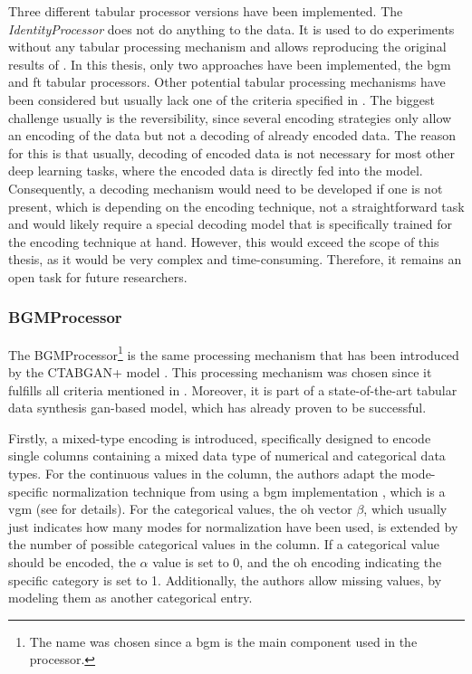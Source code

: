 Three different tabular processor versions have been implemented.
The \textit{IdentityProcessor} does not do anything to the data.
It is used to do experiments without any tabular processing mechanism and allows reproducing the original results of \cite{kotelnikov2022TabDDPMModellingTabular}.
In this thesis, only two approaches have been implemented, the \gls{bgm} and \gls{ft} tabular processors.
Other potential tabular processing mechanisms have been considered but usually lack one of the criteria specified in .
The biggest challenge usually is the reversibility, since several encoding strategies only allow an encoding of the data but not a decoding of already encoded data.
The reason for this is that usually, decoding of encoded data is not necessary for most other deep learning tasks, where the encoded data is directly fed into the model.
Consequently, a decoding mechanism would need to be developed if one is not present, which is depending on the encoding technique, not a straightforward task and would likely require a special decoding model that is specifically trained for the encoding technique at hand.
However, this would exceed the scope of this thesis, as it would be very complex and time-consuming.
Therefore, it remains an open task for future researchers.

\subsubsection{BGMProcessor}
\label{ch:BGMProcessor}

The BGMProcessor\footnote{The name was chosen since a \acrfull{bgm} is the main component used in the processor.} is the same processing mechanism that has been introduced by the CTABGAN+ model \cite{zhao2022CTABGANEnhancingTabular}.
This processing mechanism was chosen since it fulfills all criteria mentioned in .
Moreover, it is part of a state-of-the-art tabular data synthesis \gls{gan}-based model, which has already proven to be successful.

Firstly, a mixed-type encoding is introduced, specifically designed to encode single columns containing a mixed data type of numerical and categorical data types.
For the continuous values in the column, the authors adapt the mode-specific normalization technique from \cite{xu2019ModelingTabularData} using a \gls{bgm} implementation \cite{scikit-learndevelopers2023BayesianGaussianMixture}, which is a \gls{vgm} (see  for details).
For the categorical values, the \gls{oh} vector $\beta$, which usually just indicates how many modes for normalization have been used, is extended by the number of possible categorical values in the column.
If a categorical value should be encoded, the $\alpha$ value is set to 0, and the \gls{oh} encoding indicating the specific category is set to 1.
Additionally, the authors allow missing values, by modeling them as another categorical entry.

